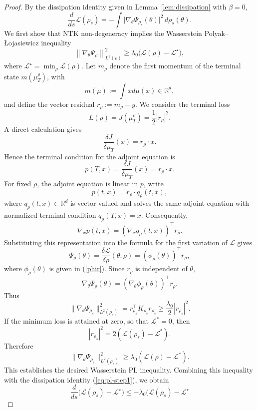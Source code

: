 \documentclass[11pt,a4wide]{article}
\theoremstyle{definition}
\begin{document}
\begin{proof}
By the dissipation identity given in Lemma~\ref{lem:dissipation}  with $\beta=0$, 
\begin{equation}
\frac{d}{ds}\mathcal L(\rho_s)
=
-
\int 
\bigl|
\nabla_\theta\Psi_{\rho_s}(\theta)
\bigr|^2
\,d\rho_s(\theta).
\label{eq:pl-step1}
\end{equation}
We first show that NTK non-degeneracy  implies the Wasserstein Polyak–Łojasiewicz 
inequality 
\[
\left\|\nabla_\theta \Psi_\rho\right\|_{L^2(\rho)}^2
\ge \lambda_0
\bigl(
\mathcal L(\rho)
-
\mathcal L^\star
\bigr),
\]
where
\(
\mathcal L^\star
=
\min_\rho\mathcal L(\rho).
\)
Let $m_\rho$ denote the first momentum of the terminal state $m(\mu_T^\rho)$, with 
$$
m(\mu):=\int x d\mu(x) \in \mathbb{R}^d, 
$$
and define the  vector residual 
$r_\rho:=m_\rho - y$. We consider the terminal loss  
$$
L(\rho)=J(\mu_T^\rho)=\frac{1}{2}|r_\rho|^2. 
$$
A direct calculation gives  
$$
\frac{\delta J}{\delta \mu_T}(x)= r_\rho \cdot x. 
$$
Hence the terminal condition for the adjoint equation is 
 $$
 p(T, x)=\frac{\delta J}{\delta \mu_T}(x)= r_\rho \cdot x.
 $$ 
 For fixed $\rho$, the adjoint equation is linear in $p$, write  
$$
p(t, x)=r_\rho \cdot q_\rho(t, x), 
$$
where $q_\rho(t, x)\in \mathbb{R}^d$ is vector-valued and solves the same adjoint equation with normalized terminal condition $q_\rho(T, x)=x$. Consequently,  
$$
\nabla_x p(t, x)=( \nabla_x q_\rho(t, x))^\top r_\rho. 
$$
Substituting this representation into the formula for the first variation of $\mathcal L$ gives
$$
\Psi_\rho(\theta)=\frac{\delta \mathcal L}{\delta \rho}(\theta; \rho)= (\phi_\rho(\theta))^\top r_\rho,
$$
where 
$
\phi_\rho(\theta)
$
is given in (\ref{phir}).  Since $r_\rho$ is independent of $\theta$,
$$
\nabla_\theta \Psi_\rho(\theta)=(\nabla_\theta \phi_\rho(\theta))^\top r_\rho. 
$$
Thus 
$$
\|\nabla_\theta \Psi_{\rho_s}\|^2_{L^2(\rho_s)}= r_{\rho_s}^\top K_{\rho_s} r_{\rho_s}  \geq \frac{\lambda_0}{2} |r_{\rho_s}|^2. 
$$
If the minimum loss is attained at zero, so that $\mathcal L^*=0$, then 
$$
|r_{\rho_s}|^2= 2( \mathcal L(\rho_s)-\mathcal L^*). 
$$
Therefore 
$$
\|\nabla_\theta \Psi_{\rho_s}\|^2_{L^2(\rho_s)} \geq  \lambda_0  (\mathcal L(\rho)-\mathcal L^* ). 
$$
This establishes the desired Wasserstein PL inequality. Combining this inequality with the dissipation identity (\ref{eq:pl-step1}), we obtain  
\[
\frac{d}{ds}
\bigl(
\mathcal L(\rho_s)-\mathcal L^\star
\bigr)
\le
-
\lambda_0
\bigl(
\mathcal L(\rho_s)-\mathcal L^\star
\]
\end{proof}
\end{document}
